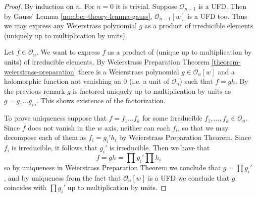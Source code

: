 \begin{proof}
By induction on $n$. For $n=0$ it is trivial. Suppose $\mathcal{O}_{n-1}$ is a
UFD. Then by Gauss' Lemma \ref{number-theory-lemma-gauss}, 
$\mathcal{O}_{n-1}[w]$ is a UFD
too. Thus we may express any Weierstrass polynomial $g$ as a product of
irreducible elements (uniquely up to multiplication by units).

Let $f\in \mathcal{O}_n$. We want to express $f$ as a product of (unique up to
multiplication by units) of irreducible elements. By Weierstrass Preparation
Theorem \ref{theorem-weierstrass-preparation} there is a Weierstrass polynomial
$g\in\mathcal{O}_n[w]$ and a holomorphic function not vanishing on $0$ (i.e. a
unit of $\mathcal{O}_n$) such that $f=gh$. By the previous remark $g$ is
factored uniquely up to multiplication by units as $g=g_1\ldots g_m$. This shows
existence of the factorization.

To prove uniqueness suppose that $f=f_1\ldots f_k$ for some irreducible
$f_1,\ldots,f_k\in\mathcal{O}_n$. Since $f$ does not vanish in the $w$ axis,
neither can each $f_i$, so that we may decompose each of them as  $f_i=g_i'h_i$
by Weierstrass Preparation Theorem. Since $f_i$ is irreducible, it follows that
$g_i'$ is irreducible. Then we have that $$ f=gh=\prod g_i'\prod h_i $$ so by
uniqueness in Weierstrass Preparation Theorem we conclude that $g=\prod g_i'$,
and by uniqueness from the fact that  $\mathcal{O}_n[w]$ is a UFD we conclude
that $g$ coincides with $\prod g_i'$ up to multiplication by units.
\end{proof}






